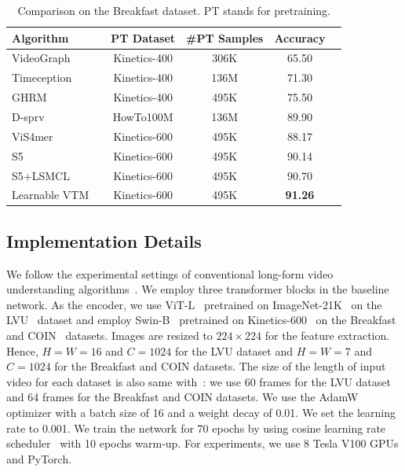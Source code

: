 \documentclass{article}
\begin{document}
\begin{table}[t]
    \caption
    {
       Comparison on the Breakfast dataset. PT stands for pretraining.
    }
    \centering
    \footnotesize
    \begin{tabular}{@{} l c c c c c @{} }
        \toprule
        Algorithm && PT Dataset & \#PT Samples & Accuracy \\
        \midrule
          VideoGraph~\citep{hussein2019videograph} && Kinetics-400 & 306K & 65.50  \\
          Timeception~\citep{hussein2019timeception} && Kinetics-400 & 136M & 71.30  \\
          GHRM~\citep{zhou2021graph} && Kinetics-400 & 495K &  75.50  \\
          D-sprv~\citep{lin2022learning} && HowTo100M & 136M &  89.90  \\
          ViS4mer~\citep{islam2022vis4mer} && Kinetics-600 & 495K & 88.17 \\
          S5~\citep{wang2023s5} && Kinetics-600 & 495K &  90.14   \\
          S5+LSMCL~\citep{wang2023s5} && Kinetics-600 & 495K &  90.70   \\          
          Learnable VTM && Kinetics-600 & 495K &  \textbf{91.26}  \\
        \bottomrule
    \end{tabular}
   \label{table:breakfast}
\end{table}

\subsection{Implementation Details}
\label{sec:detail}
We follow the experimental settings of conventional long-form video understanding algorithms~\citep{islam2022vis4mer, wang2023s5}. We employ three transformer blocks in the baseline network. As the encoder, we use ViT-L~\citep{dosovitskiy2020vit} pretrained on ImageNet-21K~\citep{ridnik2021imagenet} on the LVU~\citep{wu2021lvu} dataset and employ Swin-B~\citep{liu2021swin} pretrained on Kinetics-600~\citep{kay2017kinetics} on the Breakfast~\citep{kuehne2014breakfast} and COIN~\citep{tang2019coin} datasets. Images are resized to $224 \times 224$ for the feature extraction. Hence, $H=W=16$ and $C=1024$ for the LVU dataset and $H=W=7$ and $C=1024$ for the Breakfast and COIN datasets. The size of the length of input video for each dataset is also same with~\citep{islam2022vis4mer, wang2023s5}: we use 60 frames for the LVU dataset and 64 frames for the Breakfast and COIN datasets. We use
the AdamW~\citep{loshchilov2017decoupled} optimizer with a batch size of 16 and a weight decay of 0.01. We set the learning rate to 0.001. We train the network for 70 epochs by using cosine learning rate scheduler~\citep{gotmare2018closer} with 10 epochs warm-up. For experiments, we use 8 Tesla V100 GPUs and PyTorch. 
\end{document}
